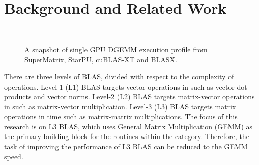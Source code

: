 \documentclass[conference]{IEEEtran}
\begin{document}
\vspace{-0.12in}
\section{Background and Related Work}
\begin{figure}
\vspace{-0.10in}
\centering
\mbox{
}
\hfil
\mbox{
}
\hfil
\mbox{
}
\hfil
\mbox{
}
\caption{A snapshot of single GPU DGEMM execution profile from SuperMatrix, StarPU, cuBLAS-XT and BLASX.}
\label{GPU_profile}
\vspace{-0.25in}
\end{figure}

There are three levels of BLAS, divided with respect to the complexity of operations. 
Level-1 (L1) BLAS targets vector operations in  such as vector dot products and 
vector norms. Level-2 (L2) BLAS targets matrix-vector operations in  such as
matrix-vector multiplication. Level-3 (L3) BLAS \cite{Dongarra} targets matrix operations 
in  time such as matrix-matrix multiplications. The focus of this research is 
on L3 BLAS, which uses General Matrix Multiplication (GEMM) as the primary building 
block for the routines within the category. Therefore, the task of improving the performance 
of L3 BLAS can be reduced to the GEMM speed.
\end{document}
